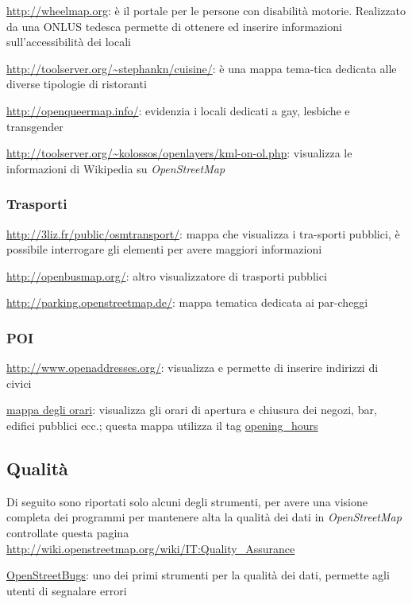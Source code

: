 \documentclass[a4paper,twoside,12pt,]{article}
\newcommand{\osm}{\emph{OpenStreetMap}\xspace}
\begin{document}
\url{http://wheelmap.org}: è il portale per le persone con disabilità motorie. Realizzato da una ONLUS tedesca permette di ottenere ed inserire informazioni sull'accessibilità dei locali

\url{http://toolserver.org/~stephankn/cuisine/}: è una mappa tema-tica dedicata alle diverse tipologie di ristoranti

\url{http://openqueermap.info/}: evidenzia i locali dedicati a gay, lesbiche e transgender 

\url{http://toolserver.org/~kolossos/openlayers/kml-on-ol.php}: visualizza le informazioni di Wikipedia su \osm

\subsubsection{Trasporti}

\url{http://3liz.fr/public/osmtransport/}: mappa che visualizza i tra-sporti pubblici, è possibile interrogare gli elementi per avere maggiori informazioni

\url{http://openbusmap.org/}: altro visualizzatore di trasporti pubblici

\url{http://parking.openstreetmap.de/}: mappa tematica dedicata ai par-cheggi

\subsubsection{POI}

\url{http://www.openaddresses.org/}: visualizza e permette di inserire indirizzi di civici

\href{http://www.netzwolf.info/kartografie/osm/time_domain/map_opening}{mappa degli orari}: visualizza gli orari di apertura e chiusura dei negozi, bar, edifici pubblici ecc.; questa mappa utilizza il tag \href{http://wiki.openstreetmap.org/wiki/Opening_hours}{opening\_hours}

\subsection{Qualità}
Di seguito sono riportati solo alcuni degli strumenti, per avere una visione completa dei programmi per mantenere alta la qualità dei dati in \osm controllate questa pagina \url{http://wiki.openstreetmap.org/wiki/IT:Quality_Assurance}

\href{http://openstreetbugs.schokokeks.org/}{OpenStreetBugs}: uno dei primi strumenti per la qualità dei dati, permette agli utenti di segnalare errori
\end{document}
